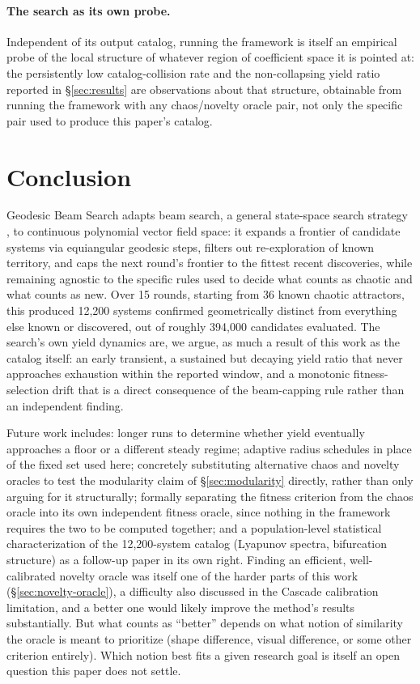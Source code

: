 \documentclass[11pt]{article}
\begin{document}
\paragraph{The search as its own probe.} Independent of its output catalog,
running the framework is itself an empirical probe of the local structure of
whatever region of coefficient space it is pointed at: the persistently low
catalog-collision rate and the non-collapsing yield ratio reported in
\S\ref{sec:results} are observations about that structure, obtainable from
running the framework with any chaos/novelty oracle pair, not only the
specific pair used to produce this paper's catalog.

\section{Conclusion}

Geodesic Beam Search adapts beam search, a general state-space search
strategy \citep{bisiani1987beam}, to continuous polynomial vector field
space: it expands a frontier of candidate systems via equiangular geodesic
steps, filters out re-exploration of known territory, and caps the next
round's frontier to the fittest recent discoveries, while remaining agnostic
to the specific rules used to decide what counts as chaotic and what counts
as new. Over 15 rounds, starting from 36 known chaotic attractors, this
produced 12{,}200 systems confirmed geometrically distinct from everything
else known or discovered, out of roughly 394{,}000 candidates evaluated. The
search's own yield dynamics are, we argue, as much a result of this work as
the catalog itself: an early transient, a sustained but decaying yield
ratio that never approaches exhaustion within the reported window, and a
monotonic fitness-selection drift that is a direct consequence of the
beam-capping rule rather than an independent finding.

Future work includes: longer runs to determine whether yield eventually
approaches a floor or a different steady regime; adaptive radius schedules in
place of the fixed set used here; concretely substituting alternative chaos
and novelty oracles to test the modularity claim of \S\ref{sec:modularity}
directly, rather than only arguing for it structurally; formally
separating the fitness criterion from the chaos oracle into its own
independent fitness oracle, since nothing in the framework requires the
two to be computed together; and a population-level
statistical characterization of the 12{,}200-system catalog (Lyapunov spectra, bifurcation
structure) as a follow-up paper in its own right. Finding an
efficient, well-calibrated novelty oracle was itself one of the harder parts
of this work (\S\ref{sec:novelty-oracle}), a difficulty also discussed in
the Cascade calibration limitation, and a
better one would likely improve the method's results substantially. But
what counts as ``better'' depends on what notion of similarity the oracle is
meant to prioritize (shape difference, visual difference, or some other
criterion entirely). Which notion best fits a given research goal is itself
an open question this paper does not settle.
\end{document}

